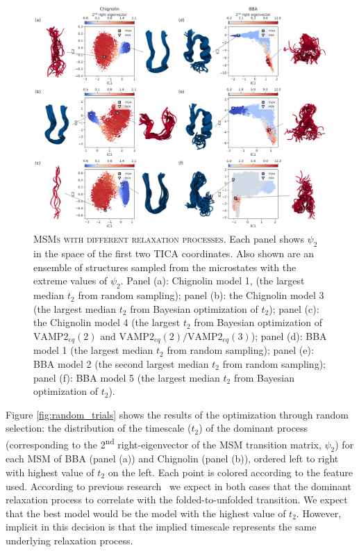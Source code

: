 \documentclass[journal=jacsat,manuscript=article]{achemso}
\begin{document}
\begin{figure}[ht]
    \centering
    \includegraphics[width=1\columnwidth]{results1/different_relaxation.png}
    \caption{\textsc{MSMs with different relaxation processes.} Each panel shows $\psi_2$ in the space of the first two TICA coordinates. Also shown are an ensemble of structures sampled from the microstates with the extreme values of $\psi_2$. Panel (a): Chignolin model 1, (the largest median $t_2$ from random sampling); panel (b): the Chignolin model 3 (the largest median $t_2$ from Bayesian optimization of $t_2$); panel (c): the Chignolin model 4 (the largest $t_2$ from Bayesian optimization of $\mathrm{VAMP2}_{eq}(2)$ and $\mathrm{VAMP2}_{eq}(2)/\mathrm{VAMP2}_{eq}(3)$); panel (d): BBA model 1 (the largest median $t_2$ from random sampling); panel (e): BBA model 2 (the second largest median $t_2$ from random sampling); panel (f): BBA model 5 (the largest median $t_2$ from Bayesian optimization of $t_2$).}
    \label{fig:psi_2_diffs}
\end{figure}

Figure \ref{fig:random_trials} shows the results of the optimization through random selection: the distribution of the timescale ($t_2$) of the dominant process (corresponding to the 2\textsuperscript{nd} right-eigenvector of the MSM transition matrix, $\psi_2$)  for each MSM of BBA (panel (a)) and Chignolin (panel (b)), ordered left to right with highest value of $t_2$ on the left. Each point is colored according to the feature used. According to previous research~\cite{scherer_variational_2019} we expect in both cases that the dominant relaxation process to correlate with the folded-to-unfolded transition. We expect that the best model would be the model with the highest value of $t_2$. However, implicit in this decision is that the implied timescale represents the same underlying relaxation process. 
\end{document}
